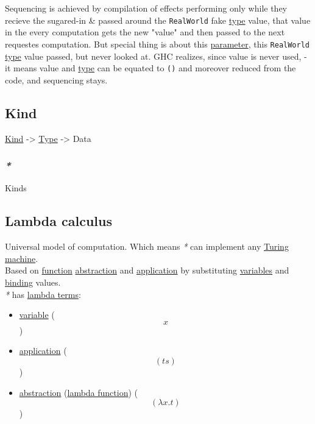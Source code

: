 \documentclass[11pt]{article}
\begin{document}
Sequencing is achieved by compilation of effects performing only while they recieve the sugared-in \& passed around the \texttt{RealWorld} fake \hyperref[org4fbaeb8]{type} value, that value in the every computation gets the new "value" and then passed to the next requestes computation. But special thing is about this \hyperref[org45d4a16]{parameter}, this \texttt{RealWorld} \hyperref[org4fbaeb8]{type} value passed, but never looked at. GHC realizes, since value is never used, - it means value and \hyperref[org4fbaeb8]{type} can be equated to \texttt{()} and moreover reduced from the code, and sequencing stays.\\

\subsection{\label{org19ec4cb}Kind}
\label{sec:orga216755}
\hyperref[org19ec4cb]{Kind} -> \hyperref[org4fbaeb8]{Type} -> Data\\

\subsubsection{\emph{*}}
\label{sec:org95a803d}

\label{orgfe0ef3e}Kinds\\

\subsection{\label{org617da6f}Lambda calculus}
\label{sec:orgca4df9d}
Universal model of computation. Which means \emph{*} can implement any \hyperref[org8daa338]{Turing machine}.\\
Based on \hyperref[orgeb5cddb]{function} \hyperref[orgd787547]{abstraction} and \hyperref[orged2f814]{application} by substituting \hyperref[orgd3f3ade]{variables} and \hyperref[org45a7ea1]{binding} values.\\

\emph{*} has \hyperref[orgccc21f9]{lambda terms}:\\
\begin{itemize}
\item \hyperref[org301bab5]{variable} ($$ x $$)\\
\item \hyperref[orged2f814]{application} ($$ (ts) $$)\\
\item \hyperref[orgd787547]{abstraction} (\hyperref[org496f5c2]{lambda function}) ($$ (\lambda x . t) $$)\\
\end{itemize}
\end{document}

